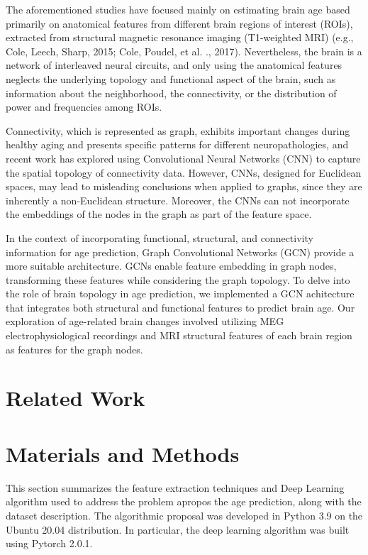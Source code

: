\documentclass{cys}
\begin{document}
\bigskip
The aforementioned studies have focused mainly on estimating brain age based primarily on anatomical features from different brain regions of interest (ROIs), extracted from structural magnetic resonance imaging (T1-weighted MRI) (e.g., Cole, Leech,  Sharp, 2015; Cole, Poudel, et al. ., 2017). Nevertheless, the brain is a network of interleaved neural circuits, and only using the anatomical features neglects the underlying topology and functional aspect of the brain, such as information about the neighborhood, the connectivity, or the distribution of power and frequencies among ROIs.

\bigskip
Connectivity, which is represented as graph, exhibits important changes during healthy aging and presents specific patterns for different neuropathologies, and recent work has explored using Convolutional Neural Networks (CNN) to capture the spatial topology of connectivity data. However, CNNs, designed for Euclidean spaces, may lead to misleading conclusions when applied to graphs, since they are inherently a non-Euclidean structure. Moreover, the CNNs can not incorporate the embeddings of the nodes in the graph as part of the feature space. 

\bigskip
In the context of incorporating functional, structural, and connectivity information for age prediction, Graph Convolutional Networks (GCN) provide a more suitable architecture. GCNs enable feature embedding in graph nodes, transforming these features while considering the graph topology. To delve into the role of brain topology in age prediction, we implemented a GCN achitecture that integrates both structural and functional features to predict brain age. Our exploration of age-related brain changes involved utilizing MEG electrophysiological recordings and MRI structural features of each brain region as features for the graph nodes.



\section{Related Work}
\label{sec:relatedWork}

\section{Materials and Methods}
\label{sec:Materials}

This section summarizes the feature extraction techniques and Deep Learning algorithm used to address the problem apropos the age prediction, along with the dataset description. The algorithmic proposal was developed in Python 3.9 on the Ubuntu 20.04 distribution. In particular, the deep learning algorithm was built using Pytorch 2.0.1.
\end{document}
